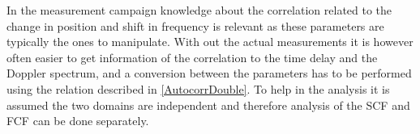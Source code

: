 In the measurement campaign knowledge about the correlation related to the change in position and shift in frequency is relevant as these parameters are typically the ones to manipulate. With out the actual measurements it is however often easier to get information of the correlation to the time delay and the Doppler spectrum, and a conversion between the parameters has to be performed using the relation described in \autoref{AutocorrDouble}.
To help in the analysis it is assumed the two domains are independent and therefore analysis of the \gls{SCF} and \gls{FCF} can be done separately.




%









